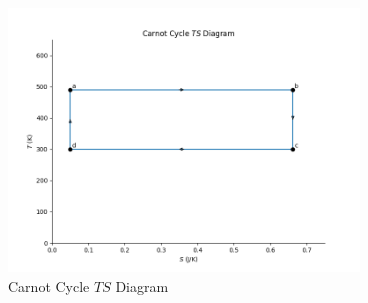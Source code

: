 \documentclass[12pt]{iopart} %
\begin{document}
\begin{figure}[htbp]
  \begin{indented}
  \item[]\includegraphics[width=0.83\textwidth]{ts-diagram-carnot-cycle.png}
  \end{indented}
  \caption{\label{fig:ts_diagram}
  Carnot Cycle $TS$ Diagram
  }
\end{figure}
\end{document}
